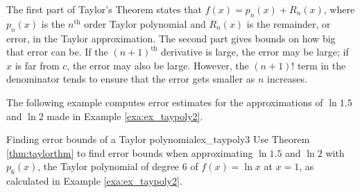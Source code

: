 The first part of Taylor's Theorem states that $f(x) = p_n(x) + R_n(x)$, where $p_n(x)$ is the $n^\text{th}$ order Taylor polynomial and $R_n(x)$ is the remainder, or error, in the Taylor approximation. The second part gives bounds on how big that error can be. If the $(n+1)^\text{th}$ derivative is large, the error may be large; if $x$ is far from $c$, the error may also be large. However, the $(n+1)!$ term in the denominator tends to ensure that the error gets smaller as $n$ increases.

The following example computes error estimates for the approximations of $\ln 1.5$ and $\ln 2$ made in Example \ref{exa:ex_taypoly2}.\\

\begin{example}{Finding error bounds of a Taylor polynomial}{ex_taypoly3}{
Use Theorem \ref{thm:taylorthm} to find error bounds when approximating $\ln 1.5$ and $\ln 2$ with $p_6(x)$, the Taylor polynomial of degree 6 of $f(x)=\ln x$ at $x=1$, as calculated in Example \ref{exa:ex_taypoly2}. }
\end{example}


